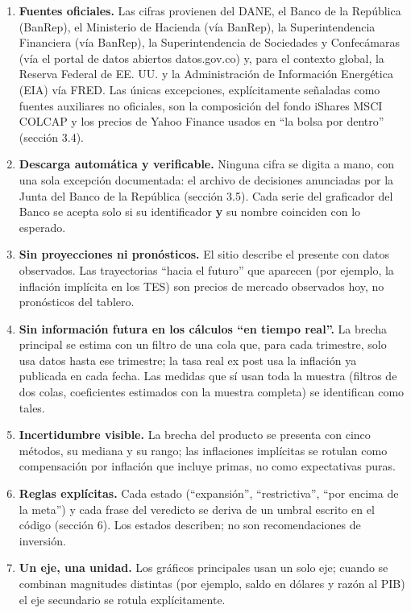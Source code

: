\begin{enumerate}
\def\labelenumi{\arabic{enumi}.}
\tightlist
\item
  \textbf{Fuentes oficiales.} Las cifras provienen del DANE, el Banco de
  la República (BanRep), el Ministerio de Hacienda (vía BanRep), la
  Superintendencia Financiera (vía BanRep), la Superintendencia de
  Sociedades y Confecámaras (vía el portal de datos abiertos
  datos.gov.co) y, para el contexto global, la Reserva Federal de EE.
  UU. y la Administración de Información Energética (EIA) vía FRED. Las
  únicas excepciones, explícitamente señaladas como fuentes auxiliares
  no oficiales, son la composición del fondo iShares MSCI COLCAP y los
  precios de Yahoo Finance usados en ``la bolsa por dentro'' (sección
  3.4).
\item
  \textbf{Descarga automática y verificable.} Ninguna cifra se digita a
  mano, con una sola excepción documentada: el archivo de decisiones
  anunciadas por la Junta del Banco de la República (sección 3.5). Cada
  serie del graficador del Banco se acepta solo si su identificador
  \textbf{y} su nombre coinciden con lo esperado.
\item
  \textbf{Sin proyecciones ni pronósticos.} El sitio describe el
  presente con datos observados. Las trayectorias ``hacia el futuro''
  que aparecen (por ejemplo, la inflación implícita en los TES) son
  precios de mercado observados hoy, no pronósticos del tablero.
\item
  \textbf{Sin información futura en los cálculos ``en tiempo real''.} La
  brecha principal se estima con un filtro de una cola que, para cada
  trimestre, solo usa datos hasta ese trimestre; la tasa real ex post
  usa la inflación ya publicada en cada fecha. Las medidas que sí usan
  toda la muestra (filtros de dos colas, coeficientes estimados con la
  muestra completa) se identifican como tales.
\item
  \textbf{Incertidumbre visible.} La brecha del producto se presenta con
  cinco métodos, su mediana y su rango; las inflaciones implícitas se
  rotulan como compensación por inflación que incluye primas, no como
  expectativas puras.
\item
  \textbf{Reglas explícitas.} Cada estado (``expansión'',
  ``restrictiva'', ``por encima de la meta'') y cada frase del veredicto
  se deriva de un umbral escrito en el código (sección 6). Los estados
  describen; no son recomendaciones de inversión.
\item
  \textbf{Un eje, una unidad.} Los gráficos principales usan un solo
  eje; cuando se combinan magnitudes distintas (por ejemplo, saldo en
  dólares y razón al PIB) el eje secundario se rotula explícitamente.
\end{enumerate}

